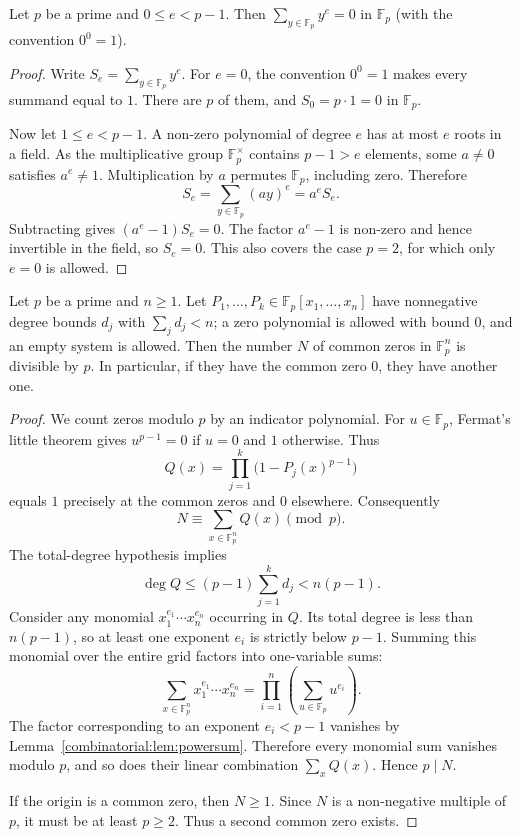 \begin{lemma}\label{combinatorial:lem:powersum}
Let $p$ be a prime and $0\le e<p-1$. Then $\sum_{y\in\mathbb F_p}y^e=0$ in $\mathbb F_p$ (with the convention $0^0=1$).
\end{lemma}
\begin{proof}
Write $S_e=\sum_{y\in\mathbb F_p}y^e$.
For $e=0$, the convention $0^0=1$ makes every
summand equal to $1$. There are $p$ of them,
and $S_0=p\cdot1=0$ in $\mathbb F_p$.

Now let $1\le e<p-1$. A non-zero polynomial of
degree $e$ has at most $e$ roots in a field.
As the multiplicative group $\mathbb F_p^\times$
contains $p-1>e$ elements, some $a\ne0$ satisfies
$a^e\ne1$. Multiplication by $a$ permutes
$\mathbb F_p$, including zero. Therefore
\[
S_e=\sum_{y\in\mathbb F_p}(ay)^e=a^eS_e.
\]
Subtracting gives $(a^e-1)S_e=0$. The factor
$a^e-1$ is non-zero and hence invertible in the
field, so $S_e=0$. This also covers the case
$p=2$, for which only $e=0$ is allowed.
\end{proof}

\begin{theorem}\label{combinatorial:thm:cw}
Let $p$ be a prime and $n\ge1$. Let $P_1,\dots,P_k\in\mathbb F_p[x_1,\dots,x_n]$
have nonnegative degree bounds $d_j$ with $\sum_jd_j<n$; a zero polynomial
is allowed with bound $0$, and an empty system is allowed.
Then the number $N$ of common zeros in $\mathbb F_p^n$ is divisible by $p$. In particular, if they
have the common zero $0$, they have another one.
\end{theorem}
\begin{proof}
We count zeros modulo $p$ by an indicator
polynomial. For $u\in\mathbb F_p$,
Fermat's little theorem gives
$u^{p-1}=0$ if $u=0$ and $1$ otherwise.
Thus
\[
Q(x)=\prod_{j=1}^k\bigl(1-P_j(x)^{p-1}\bigr)
\]
equals $1$ precisely at the common
zeros and $0$ elsewhere. Consequently
\[
N\equiv\sum_{x\in\mathbb F_p^n}Q(x)\pmod p.
\]
The total-degree hypothesis implies
\[
\deg Q\le(p-1)\sum_{j=1}^k d_j
 <n(p-1).
\]
Consider any monomial
$x_1^{e_1}\cdots x_n^{e_n}$ occurring in
$Q$. Its total degree is less than
$n(p-1)$, so at least one exponent
$e_i$ is strictly below $p-1$.
Summing this monomial over the entire
grid factors into one-variable sums:
\[
\sum_{x\in\mathbb F_p^n}
  x_1^{e_1}\cdots x_n^{e_n}
=\prod_{i=1}^n
  \left(\sum_{u\in\mathbb F_p}u^{e_i}\right).
\]
The factor corresponding to an exponent
$e_i<p-1$ vanishes by
Lemma~\ref{combinatorial:lem:powersum}.
Therefore every monomial sum vanishes
modulo $p$, and so does their linear
combination $\sum_xQ(x)$. Hence
$p\mid N$.

If the origin is a common zero, then
$N\ge1$. Since $N$ is a non-negative
multiple of $p$, it must be at least
$p\ge2$. Thus a second common zero exists.
\end{proof}

